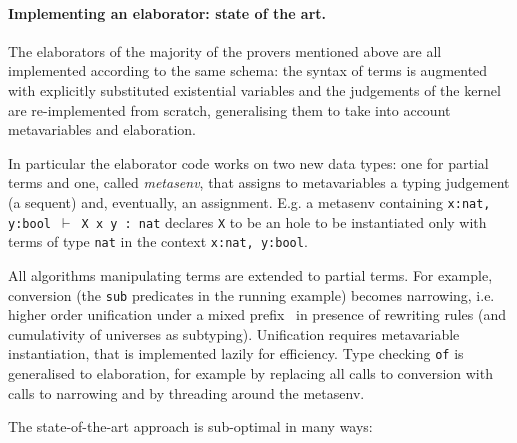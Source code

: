 \documentclass{easychair}
\begin{document}
\paragraph{Implementing an elaborator: state of the art.}  %

The elaborators of the majority of the provers mentioned above are all
implemented according to the same schema: the syntax of terms is augmented with
explicitly substituted existential variables
and the judgements of the kernel are re-implemented from scratch, generalising
them to take into account metavariables and elaboration.

In particular the elaborator code works on two new data types: one for partial terms and one, called \emph{metasenv}, that assigns to metavariables a typing judgement (a sequent) and, eventually, an assignment. E.g. a metasenv containing \verb+x:nat, y:bool +$\vdash$\verb+ X x y : nat+ declares \verb+X+ to be an hole to be instantiated only with terms of type \verb+nat+ in the context \verb+x:nat, y:bool+.

All algorithms manipulating terms are extended to partial
terms. For example, conversion (the \verb+sub+ predicates in the running
example) becomes narrowing, i.e. higher order unification under a
mixed prefix~\cite{mixedprefix} in presence of rewriting rules (and cumulativity of universes as subtyping).
Unification requires metavariable instantiation, that is
implemented lazily for efficiency.  Type checking \verb+of+ is generalised to
elaboration, for example by replacing all calls to conversion with calls to
narrowing and by threading around the metasenv.

The state-of-the-art approach is sub-optimal in many ways:
\end{document}
